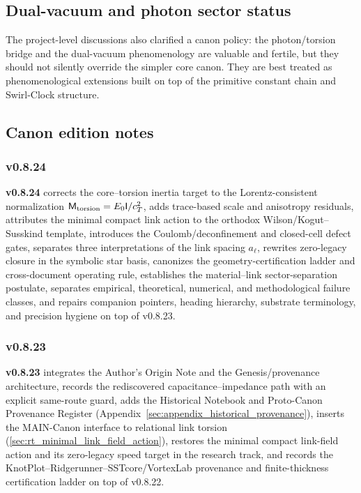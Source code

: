 \documentclass[11pt]{article}
\theoremstyle{definition}
\theoremstyle{plain}
\theoremstyle{remark}
\begin{document}
        \subsection{Dual-vacuum and photon sector status}
            The project-level discussions also clarified a canon policy: the photon/torsion bridge and the dual-vacuum phenomenology are valuable and fertile, but they should not silently override the simpler core canon. They are best treated as phenomenological extensions built on top of the primitive constant chain and Swirl-Clock structure.

        \subsection{Canon edition notes}

        \subsubsection{v0.8.24}
            \textbf{v0.8.24} corrects the core--torsion inertia target to the Lorentz-consistent normalization \(\mathsf M_{\rm torsion}=E_0\mathsf I/c_T^2\), adds trace-based scale and anisotropy residuals, attributes the minimal compact link action to the orthodox Wilson/Kogut--Susskind template, introduces the Coulomb/deconfinement and closed-cell defect gates, separates three interpretations of the link spacing \(a_\ell\), rewrites zero-legacy closure in the symbolic star basis, canonizes the geometry-certification ladder and cross-document operating rule, establishes the material--link sector-separation postulate, separates empirical, theoretical, numerical, and methodological failure classes, and repairs companion pointers, heading hierarchy, substrate terminology, and precision hygiene on top of v0.8.23.

        \subsubsection{v0.8.23}
            \textbf{v0.8.23} integrates the Author's Origin Note and the Genesis/provenance architecture, records the rediscovered capacitance--impedance path with an explicit same-route guard, adds the Historical Notebook and Proto-Canon Provenance Register (Appendix~\ref{sec:appendix_historical_provenance}), inserts the MAIN-Canon interface to relational link torsion (\ref{sec:rt_minimal_link_field_action}), restores the minimal compact link-field action and its zero-legacy speed target in the research track, and records the KnotPlot--Ridgerunner--SSTcore/VortexLab provenance and finite-thickness certification ladder on top of v0.8.22.
\end{document}
